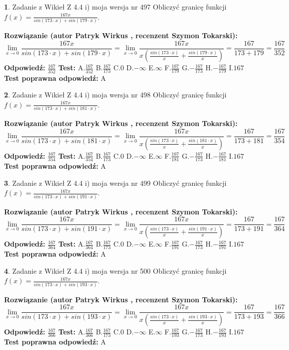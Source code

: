 \documentclass[12pt, a4paper]{article}
\theoremstyle{definition} %
\newtheorem{zad}{}
\newcommand{\zadStart}[1]{\begin{zad}#1\newline}
\newcommand{\zadStop}{\end{zad}}
\newcommand{\rozwStart}[2]{\noindent \textbf{Rozwiązanie (autor #1 , recenzent #2): }\newline}
\newcommand{\rozwStop}{\newline}
\newcommand{\odpStart}{\noindent \textbf{Odpowiedź:}\newline}
\newcommand{\odpStop}{\newline}
\newcommand{\testStart}{\noindent \textbf{Test:}\newline}
\newcommand{\testStop}{\newline}
\newcommand{\kluczStart}{\noindent \textbf{Test poprawna odpowiedź:}\newline}
\newcommand{\kluczStop}{\newline}
\begin{document}
\zadStart{Zadanie z Wikieł Z 4.4 i) moja wersja nr 497}
Obliczyć granicę funkcji $f(x)=\frac{167x}{sin(173\cdot x) +sin(179\cdot x)}$.
\zadStop
\rozwStart{Patryk Wirkus}{Szymon Tokarski}
$$\lim\limits_{x\to 0}\frac{167x}{sin(173\cdot x) +sin(179\cdot x)}=\lim\limits_{x\to 0}\frac{167x}{x(\frac{sin(173\cdot x)}{x}+\frac{sin(179\cdot x)}{x})}=\frac{167}{173+179} = \frac{167}{352}$$
\rozwStop
\odpStart
$\frac{167}{352}$
\odpStop
\testStart
A.$\frac{167}{352}$
B.$\frac{167}{173}$
C.$0$
D.$-\infty$
E.$\infty$
F.$\frac{167}{179}$
G.$-\frac{167}{173}$
H.$-\frac{167}{179}$
I.$167$
\testStop
\kluczStart
A
\kluczStop



\zadStart{Zadanie z Wikieł Z 4.4 i) moja wersja nr 498}
Obliczyć granicę funkcji $f(x)=\frac{167x}{sin(173\cdot x) +sin(181\cdot x)}$.
\zadStop
\rozwStart{Patryk Wirkus}{Szymon Tokarski}
$$\lim\limits_{x\to 0}\frac{167x}{sin(173\cdot x) +sin(181\cdot x)}=\lim\limits_{x\to 0}\frac{167x}{x(\frac{sin(173\cdot x)}{x}+\frac{sin(181\cdot x)}{x})}=\frac{167}{173+181} = \frac{167}{354}$$
\rozwStop
\odpStart
$\frac{167}{354}$
\odpStop
\testStart
A.$\frac{167}{354}$
B.$\frac{167}{173}$
C.$0$
D.$-\infty$
E.$\infty$
F.$\frac{167}{181}$
G.$-\frac{167}{173}$
H.$-\frac{167}{181}$
I.$167$
\testStop
\kluczStart
A
\kluczStop



\zadStart{Zadanie z Wikieł Z 4.4 i) moja wersja nr 499}
Obliczyć granicę funkcji $f(x)=\frac{167x}{sin(173\cdot x) +sin(191\cdot x)}$.
\zadStop
\rozwStart{Patryk Wirkus}{Szymon Tokarski}
$$\lim\limits_{x\to 0}\frac{167x}{sin(173\cdot x) +sin(191\cdot x)}=\lim\limits_{x\to 0}\frac{167x}{x(\frac{sin(173\cdot x)}{x}+\frac{sin(191\cdot x)}{x})}=\frac{167}{173+191} = \frac{167}{364}$$
\rozwStop
\odpStart
$\frac{167}{364}$
\odpStop
\testStart
A.$\frac{167}{364}$
B.$\frac{167}{173}$
C.$0$
D.$-\infty$
E.$\infty$
F.$\frac{167}{191}$
G.$-\frac{167}{173}$
H.$-\frac{167}{191}$
I.$167$
\testStop
\kluczStart
A
\kluczStop



\zadStart{Zadanie z Wikieł Z 4.4 i) moja wersja nr 500}
Obliczyć granicę funkcji $f(x)=\frac{167x}{sin(173\cdot x) +sin(193\cdot x)}$.
\zadStop
\rozwStart{Patryk Wirkus}{Szymon Tokarski}
$$\lim\limits_{x\to 0}\frac{167x}{sin(173\cdot x) +sin(193\cdot x)}=\lim\limits_{x\to 0}\frac{167x}{x(\frac{sin(173\cdot x)}{x}+\frac{sin(193\cdot x)}{x})}=\frac{167}{173+193} = \frac{167}{366}$$
\rozwStop
\odpStart
$\frac{167}{366}$
\odpStop
\testStart
A.$\frac{167}{366}$
B.$\frac{167}{173}$
C.$0$
D.$-\infty$
E.$\infty$
F.$\frac{167}{193}$
G.$-\frac{167}{173}$
H.$-\frac{167}{193}$
I.$167$
\testStop
\kluczStart
A
\kluczStop
\end{document}
